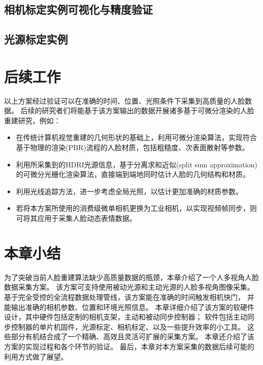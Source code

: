 \subsection{相机标定实例可视化与精度验证}

\subsection{光源标定实例}

\section{后续工作}

以上方案经过验证可以在准确的时间、位置、光照条件下采集到高质量的人脸数据。
后续的研究者们将能基于该方案输出的数据开展诸多基于可微分渲染的人脸重建研究，例如：
\begin{itemize}
\item 在传统计算机视觉重建的几何形状的基础上，利用可微分渲染算法，实现符合基于物理的渲染(PBR)流程的人脸材质，包括粗糙度、次表面散射等参数。
\item 利用所采集到的HDRI光源信息，基于分离求和近似(split sum approximation)的可微分光栅化渲染算法，直接端到端地同时估计人脸的几何结构和材质。
\item 利用光线追踪方法，进一步考虑全局光照，以估计更加准确的材质参数。
\item 若将本方案所使用的消费级微单相机更换为工业相机，以实现视频帧同步，则可将其应用于采集人脸动态表情数据。
\end{itemize}

\section*{本章小结}

为了突破当前人脸重建算法缺少高质量数据的瓶颈，本章介绍了一个人多视角人脸数据采集方案。
该方案可支持使用被动光源和主动光源的人脸多视角图像采集。
基于完全受控的全流程数据处理管线，该方案能在准确的时间触发相机快门，
并能输出准确的相机参数、位置和环境光照信息。
本章详细介绍了该方案的软硬件设计，其中硬件包括定制的相机支架，主动和被动同步控制器；
软件包括主动同步控制器的单片机固件，光源标定、相机标定、以及一些提升效率的小工具。
这些部分有机结合成了一个精确、高效且灵活可扩展的采集方案。
本章还介绍了该方案的实现过程和各个环节的验证。
最后，本章对本方案采集的数据后续可能的利用方式做了展望。
